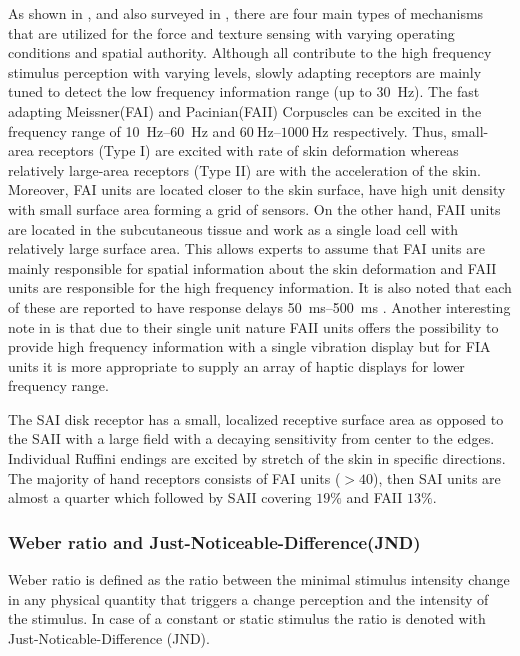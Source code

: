 As shown in , and also surveyed in \cite{kontarinis}, there are four main types of mechanisms that are utilized for the force and texture sensing with varying operating conditions and spatial authority. Although all contribute to the high frequency stimulus perception with varying levels, slowly adapting receptors are mainly tuned to detect the low frequency information range (up to \SI{30}{\hertz}). The fast adapting Meissner(FAI) and Pacinian(FAII) Corpuscles can be excited in the frequency range of \SIrange{10}{60}{\hertz} and $\SIrange{60}{1000}{\hertz}$ respectively. Thus, small-area receptors (Type I) are excited with rate of skin deformation whereas relatively large-area receptors (Type II) are with the acceleration of the skin. Moreover, FAI units are located closer to the skin surface, have high unit density with small surface area forming a grid of sensors. On the other hand, FAII units are located in the subcutaneous tissue and work as a single load cell with relatively large surface area. This allows experts to assume that FAI units are mainly responsible for spatial information about the skin deformation and FAII units are responsible for the high frequency information. It is also noted that each of these are reported to have response delays \SIrange{50}{500}{\milli\second} \cite{idareview}. Another interesting note in \cite{kontarinis} is that due to their single unit nature FAII units offers the possibility to provide high frequency information with a single vibration display but for FIA units it is more appropriate to supply an array of haptic displays for lower frequency range.  

The SAI disk receptor has a small, localized receptive surface area as opposed to the SAII with a large field with a decaying sensitivity from center to the edges. Individual Ruffini endings are excited by stretch of the skin in specific directions. The majority of hand receptors consists of FAI units ($>40$), then SAI units are almost a quarter which followed by SAII covering $19\%$ and FAII $13\%$. 


\subsubsection{Weber ratio and Just-Noticeable-Difference(JND) }

Weber ratio is defined as the ratio between the minimal stimulus intensity change in any physical quantity that triggers a change perception and the intensity of the stimulus. In case of a constant or static stimulus the ratio is denoted with Just-Noticable-Difference (JND). 


